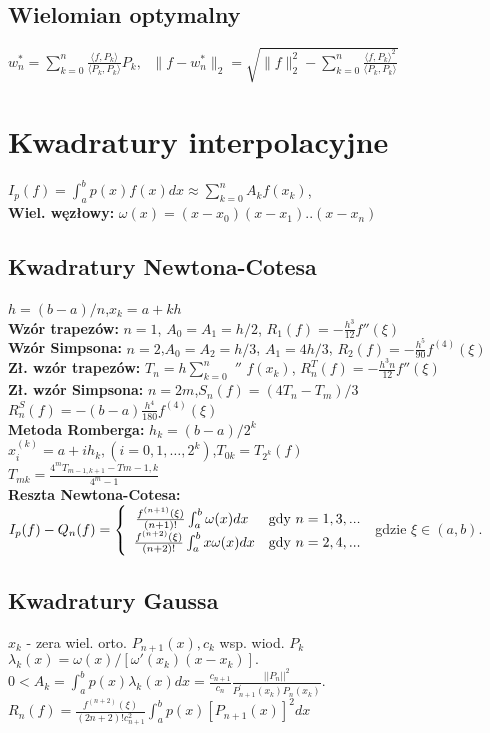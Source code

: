 \documentclass[a4paper,twocolumn]{article}
\begin{document}
\subsection{Wielomian optymalny}

$w_n^* = \sum_{k=0}^n \frac{\langle f, P_k \rangle}{\langle P_k, P_k \rangle} P_k,\;$
$\|f-w_n^*\|_2 = \sqrt{\|f\|_2^2 - \sum_{k=0}^n \frac{{\langle f, P_k \rangle}^2}{\langle P_k, P_k \rangle}}$

\section{Kwadratury interpolacyjne}
\noindent $I_p(f) = \int_{a}^{b}p(x)f(x)dx \approx \sum_{k=0}^{n}A_kf(x_k)$, \\
\textbf{Wiel. węzłowy:} $\omega(x) = (x-x_0)(x-x_1)..(x-x_n)$

\subsection{Kwadratury Newtona-Cotesa}
$h=(b-a)/n$,\quad $x_k=a+kh$\\
\textbf{Wzór trapezów:}  $n=1$, $A_0=A_1=h/2$, $R_1(f)=-\frac{h^3}{12}f''(\xi)$\\
\textbf{Wzór Simpsona:} $n=2$,$A_0=A_2=h/3$, $A_1=4h/3$, $R_2(f)=-\frac{h^5}{90}f^{(4)}(\xi)$\\
\textbf{Zł. wzór trapezów:} $T_n=h\sum_{k=0}^{n}$ $''$ $f(x_k)$,
$R_n^T(f)=-\frac{h^3n}{12}f''(\xi)$\\
\textbf{Zł. wzór Simpsona:} $n=2m$,\quad $S_n(f)=(4T_n-T_m)/3$\\
$R_n^S(f)=-(b-a)\frac{h^4}{180}f^{(4)}(\xi)$\\
\textbf{Metoda Romberga:} $h_k=(b-a)/2^k$\\
$x_i^(k)=a+ih_k,(i=0,1,\dots,2^k)$,\quad $T_{0k}=T_{2^k}(f)$\\
$T_{mk}=\frac{4^mT_{m-1,k+1} - T{m-1,k}}{4^m-1}$\\
\textbf{Reszta Newtona-Cotesa:} \\
\noindent$  I_p(f) - Q_n(f) = \left\{ \begin{array}{ll}
\left.\frac{f^{(n+1)}(\xi)}{(n+1)!}\int_{a}^{b} \omega(x) dx
\right. & \textrm{gdy $ n = 1,3,... $}\\
\frac{f^{(n+2)}(\xi)}{(n+2)!}\int_{a}^{b} x\omega(x) dx & \textrm{gdy $ n = 2,4,... $}
\end{array} \right.
$
gdzie $\xi \in (a, b).$
\subsection{Kwadratury Gaussa}
\noindent$x_k$ - zera wiel. orto. $P_{n+1}(x), c_k $ wsp. wiod. $P_k$\\
$\lambda_k(x) = \omega(x) / [\omega'(x_k)(x-x_k)]. $ \\
$0 < A_k=\int_{a}^{b}p(x)\lambda_k(x) dx = \frac{c_{n+1}}{c_n} \frac{||P_n||^2}{P_{n+1}^{'}(x_k)P_n(x_k)}$.  \\
$R_n(f)=\frac{f^{(n+2)}(\xi)}{(2n+2)!c_{n+1}^{2} }\int_a^bp(x)[P_{n+1}(x)]^2 dx $
\end{document}
